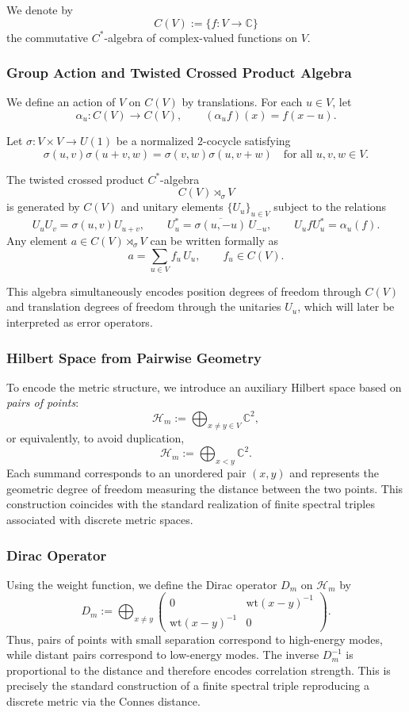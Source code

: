 \documentclass[12pt]{article}
\theoremstyle{definition} %
\theoremstyle{plain} %
\theoremstyle{remark} %
\theoremstyle{underline}
\begin{document}
We denote by
\[
    C(V) := \{ f: V \to \mathbb{C} \}
\]
the commutative $C^*$-algebra of complex-valued functions on $V$.

\subsubsection*{Group Action and Twisted Crossed Product Algebra}

We define an action of $V$ on $C(V)$ by translations. For each $u\in V$, let
\[
    \alpha_u: C(V) \to C(V), \qquad (\alpha_u f)(x)=f(x-u).
\]

Let $\sigma: V\times V \to U(1)$ be a normalized $2$-cocycle satisfying
\[
    \sigma(u,v)\sigma(u+v,w)=\sigma(v,w)\sigma(u,v+w)
    \quad \text{for all } u,v,w\in V.
\]

The twisted crossed product $C^*$-algebra
\[
    C(V)\rtimes_\sigma V
\]
is generated by $C(V)$ and unitary elements $\{U_u\}_{u\in V}$ subject to the relations
\[
    U_uU_v=\sigma(u,v)U_{u+v},\qquad
    U_u^*=\overline{\sigma(u,-u)}\,U_{-u},\qquad
    U_u f U_u^*=\alpha_u(f).
\]
Any element $a\in C(V)\rtimes_\sigma V$ can be written formally as
\[
    a=\sum_{u\in V} f_u\,U_u, \qquad f_u\in C(V).
\]

This algebra simultaneously encodes position degrees of freedom through $C(V)$ and translation degrees of freedom through the unitaries $U_u$, which will later be interpreted as error operators.

\subsubsection*{Hilbert Space from Pairwise Geometry}

To encode the metric structure, we introduce an auxiliary Hilbert space based on \emph{pairs of points}:
\[
    \mathcal H_m := \bigoplus_{x\neq y\in V} \mathbb C^2,
\]
or equivalently, to avoid duplication,
\[
    \mathcal H_m := \bigoplus_{x<y} \mathbb C^2.
\]
Each summand corresponds to an unordered pair $(x,y)$ and represents the geometric degree of freedom measuring the distance between the two points. This construction coincides with the standard realization of finite spectral triples associated with discrete metric spaces.

\subsubsection*{Dirac Operator}

Using the weight function, we define the Dirac operator $D_m$ on $\mathcal H_m$ by
\[
    D_m
    := \bigoplus_{x\neq y}
    \begin{pmatrix}
        0 & \mathrm{wt}(x-y)^{-1} \\
        \mathrm{wt}(x-y)^{-1} & 0
    \end{pmatrix}.
\]
Thus, pairs of points with small separation correspond to high-energy modes, while distant pairs correspond to low-energy modes. The inverse $D_m^{-1}$ is proportional to the distance and therefore encodes correlation strength.
This is precisely the standard construction of a finite spectral triple reproducing a discrete metric via the Connes distance.
\end{document}
